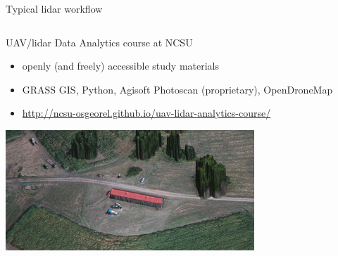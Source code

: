 \documentclass[xcolor={dvipsnames,usenames},beamer,aspectratio=169]{beamer}
\begin{document}
\begin{frame}{Typical lidar workflow}
\begin{columns}
\begin{column}{0.45\textwidth}












\end{column}
\end{columns}

\end{frame}


\begin{frame}{UAV/lidar Data Analytics course at NCSU}

\begin{itemize}
  \item openly (and freely) accessible study materials
  \item GRASS GIS, Python, Agisoft Photoscan (proprietary), OpenDroneMap
  \item \url{http://ncsu-osgeorel.github.io/uav-lidar-analytics-course/}
\end{itemize}

\centering
\includegraphics[width=0.7\textwidth]{agisoft_detail}%

\end{frame}
\end{document}

